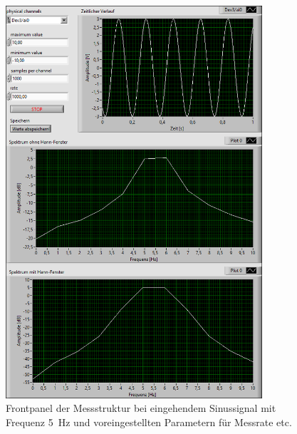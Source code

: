 \begin{figure}[H]
	\centering
	\includegraphics[width=0.85\textwidth]{pic/abtast_5Hz.png}	
	\caption{Frontpanel der Messstruktur bei eingehendem Sinussignal mit Frequenz \SI{5}{\hertz} und voreingestellten Parametern für Messrate etc.}
	\label{fig:abtast_5Hz}
\end{figure}
	
